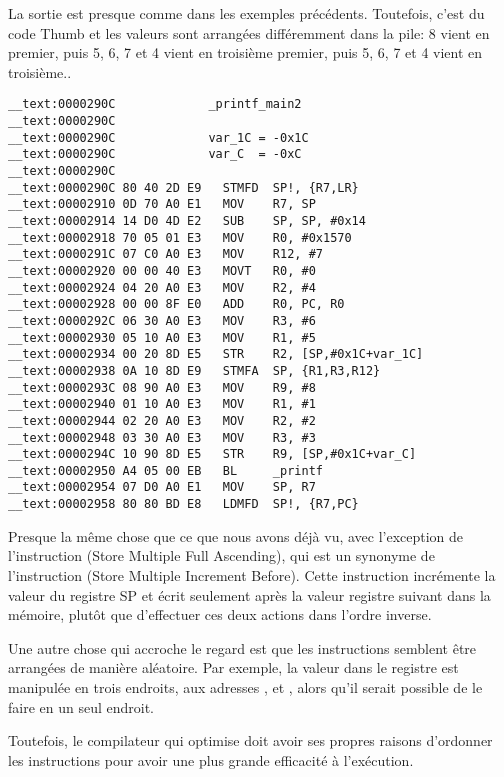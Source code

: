 La sortie est presque comme dans les exemples précédents. Toutefois, c'est du code
Thumb et les valeurs sont arrangées différemment dans la pile:
8 vient en premier, puis 5, 6, 7 et 4 vient en troisième premier, puis 5, 6, 7 et 4 vient en troisième..

\myparagraph{\OptimizingXcodeIV: \ARMMode}

\begin{lstlisting}[style=customasmARM]
__text:0000290C             _printf_main2
__text:0000290C
__text:0000290C             var_1C = -0x1C
__text:0000290C             var_C  = -0xC
__text:0000290C
__text:0000290C 80 40 2D E9   STMFD  SP!, {R7,LR}
__text:00002910 0D 70 A0 E1   MOV    R7, SP
__text:00002914 14 D0 4D E2   SUB    SP, SP, #0x14
__text:00002918 70 05 01 E3   MOV    R0, #0x1570
__text:0000291C 07 C0 A0 E3   MOV    R12, #7
__text:00002920 00 00 40 E3   MOVT   R0, #0
__text:00002924 04 20 A0 E3   MOV    R2, #4
__text:00002928 00 00 8F E0   ADD    R0, PC, R0
__text:0000292C 06 30 A0 E3   MOV    R3, #6
__text:00002930 05 10 A0 E3   MOV    R1, #5
__text:00002934 00 20 8D E5   STR    R2, [SP,#0x1C+var_1C]
__text:00002938 0A 10 8D E9   STMFA  SP, {R1,R3,R12}
__text:0000293C 08 90 A0 E3   MOV    R9, #8
__text:00002940 01 10 A0 E3   MOV    R1, #1
__text:00002944 02 20 A0 E3   MOV    R2, #2
__text:00002948 03 30 A0 E3   MOV    R3, #3
__text:0000294C 10 90 8D E5   STR    R9, [SP,#0x1C+var_C]
__text:00002950 A4 05 00 EB   BL     _printf
__text:00002954 07 D0 A0 E1   MOV    SP, R7
__text:00002958 80 80 BD E8   LDMFD  SP!, {R7,PC}
\end{lstlisting}

Presque la même chose que ce que nous avons déjà vu, avec l'exception de l'instruction
 (Store Multiple Full Ascending), qui est un synonyme de l'instruction
 (Store Multiple Increment Before).
Cette instruction incrémente la valeur du registre \ac{SP} et écrit seulement
après la valeur registre suivant dans la mémoire, plutôt que d'effectuer ces
deux actions dans l'ordre inverse.

Une autre chose qui accroche le regard est que les instructions semblent être arrangées
de manière aléatoire.
Par exemple, la valeur dans le registre  est manipulée en trois endroits,
aux adresses ,  et , alors qu'il serait possible
de le faire en un seul endroit.

Toutefois, le compilateur qui optimise doit avoir ses propres raisons d'ordonner
les instructions pour avoir une plus grande efficacité à l'exécution.


